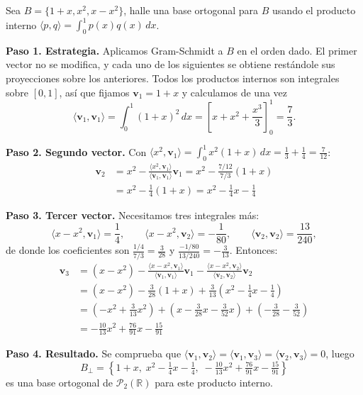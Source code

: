 \begin{example}
Sea $B= \{1+x, x^2, x-x^2\}$, halle una base ortogonal para $B$ usando el producto interno $\langle p,q\rangle = \int_0^1 p(x)q(x)\,dx$.
\begin{myproof}
\textbf{Paso 1. Estrategia.} Aplicamos Gram-Schmidt a $B$ en el orden dado. El primer vector no se modifica, y cada uno de los siguientes se obtiene restándole sus proyecciones sobre los anteriores. Todos los productos internos son integrales sobre $[0,1]$, así que fijamos $\mathbf{v}_1 = 1+x$ y calculamos de una vez
\[
\langle \mathbf{v}_1, \mathbf{v}_1 \rangle = \int_0^1 (1+x)^2\,dx = \left[ x + x^2 + \frac{x^3}{3} \right]_0^1 = \frac{7}{3}.
\]

\textbf{Paso 2. Segundo vector.} Con $\langle x^2, \mathbf{v}_1\rangle = \int_0^1 x^2(1+x)\,dx = \frac{1}{3}+\frac{1}{4} = \frac{7}{12}$:
\begin{align*}
\mathbf{v}_2 &= x^2 - \frac{\langle x^2, \mathbf{v}_1\rangle}{\langle \mathbf{v}_1, \mathbf{v}_1\rangle} \mathbf{v}_1
    = x^2 - \frac{7/12}{7/3} (1+x) \\
    &= x^2 - \frac{1}{4}(1+x)
    = x^2 - \frac{1}{4}x - \frac{1}{4}
\end{align*}

\textbf{Paso 3. Tercer vector.} Necesitamos tres integrales más:
\[
\langle x-x^2, \mathbf{v}_1 \rangle = \frac{1}{4}, \qquad
\langle x-x^2, \mathbf{v}_2 \rangle = -\frac{1}{80}, \qquad
\langle \mathbf{v}_2, \mathbf{v}_2 \rangle = \frac{13}{240},
\]
de donde los coeficientes son $\frac{1/4}{7/3} = \frac{3}{28}$ y $\frac{-1/80}{13/240} = -\frac{3}{13}$. Entonces:
\begin{align*}
\mathbf{v}_3 &= (x - x^2) - \frac{\langle x - x^2, \mathbf{v}_1\rangle}{\langle \mathbf{v}_1, \mathbf{v}_1\rangle} \mathbf{v}_1 - \frac{\langle x - x^2, \mathbf{v}_2\rangle}{\langle \mathbf{v}_2, \mathbf{v}_2\rangle} \mathbf{v}_2 \\
    &= (x - x^2) - \frac{3}{28} (1+x) + \frac{3}{13} \left(x^2 - \frac{1}{4}x - \frac{1}{4}\right) \\
    &= \left(-x^2 + \frac{3}{13}x^2\right) + \left(x - \frac{3}{28}x - \frac{3}{52}x\right) + \left(-\frac{3}{28} - \frac{3}{52}\right) \\
    &= -\frac{10}{13}x^2 + \frac{76}{91}x - \frac{15}{91}
\end{align*}

\textbf{Paso 4. Resultado.} Se comprueba que $\langle \mathbf{v}_1, \mathbf{v}_2 \rangle = \langle \mathbf{v}_1, \mathbf{v}_3 \rangle = \langle \mathbf{v}_2, \mathbf{v}_3 \rangle = 0$, luego
$$\boxed{B_\perp = \left\{1+x,\; x^2 - \tfrac{1}{4}x - \tfrac{1}{4},\; -\tfrac{10}{13}x^2 + \tfrac{76}{91}x - \tfrac{15}{91}\right\}}$$
es una base ortogonal de $\mathcal{P}_2(\mathbb{R})$ para este producto interno.
\end{myproof}
\end{example}

